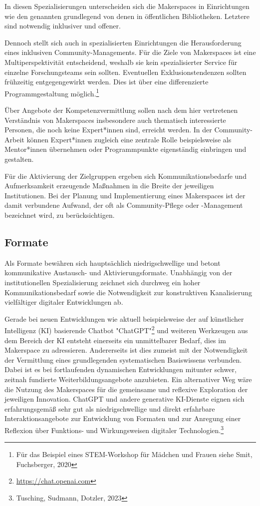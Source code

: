 \documentclass[a4paper,
fontsize=11pt,
oneside,
numbers=noperiodatend,
parskip=half-,
bibliography=totoc,
final
]{scrartcl}
\begin{document}
In diesen Spezialisierungen unterscheiden sich die Makerspaces in
Einrichtungen wie den genannten grundlegend von denen in öffentlichen
Bibliotheken. Letztere sind notwendig inklusiver und offener.

Dennoch stellt sich auch in spezialisierten Einrichtungen die
Herausforderung eines inklusiven Community-Managements. Für die Ziele
von Makerspaces ist eine Multiperspektivität entscheidend, weshalb sie
kein spezialisierter Service für einzelne Forschungsteams sein sollten.
Eventuellen Exklusionstendenzen sollten frühzeitig entgegengewirkt
werden. Dies ist über eine differenzierte Programmgestaltung
möglich.\footnote{Für das Beispiel eines STEM-Workshop für Mädchen und
  Frauen siehe Smit, Fuchsberger, 2020}

Über Angebote der Kompetenzvermittlung sollen nach dem hier vertretenen
Verständnis von Makerspaces insbesondere auch thematisch interessierte
Personen, die noch keine Expert*innen sind, erreicht werden. In der
Community-Arbeit können Expert*innen zugleich eine zentrale Rolle
beispielsweise als Mentor*innen übernehmen oder Programmpunkte
eigenständig einbringen und gestalten.

Für die Aktivierung der Zielgruppen ergeben sich Kommunikationsbedarfe
und Aufmerksamkeit erzeugende Maßnahmen in die Breite der jeweiligen
Institutionen. Bei der Planung und Implementierung eines Makerspaces ist
der damit verbundene Aufwand, der oft als Community-Pflege oder
-Management bezeichnet wird, zu berücksichtigen.

\hypertarget{formate}{%
\subsection{Formate}\label{formate}}

Als Formate bewähren sich hauptsächlich niedrigschwellige und betont
kommunikative Austausch- und Aktivierungsformate. Unabhängig von der
institutionellen Spezialisierung zeichnet sich durchweg ein hoher
Kommunikationsbedarf sowie die Notwendigkeit zur konstruktiven
Kanalisierung vielfältiger digitaler Entwicklungen ab.

Gerade bei neuen Entwicklungen wie aktuell beispielsweise der auf
künstlicher Intelligenz (KI) basierende Chatbot "ChatGPT"\footnote{\url{https://chat.openai.com}}
und weiteren Werkzeugen aus dem Bereich der KI entsteht einerseits ein
unmittelbarer Bedarf, dies im Makerspace zu adressieren. Andererseits
ist dies zumeist mit der Notwendigkeit der Vermittlung eines
grundlegenden systematischen Basiswissens verbunden. Dabei ist es bei
fortlaufenden dynamischen Entwicklungen mitunter schwer, zeitnah
fundierte Weiterbildungsangebote anzubieten. Ein alternativer Weg wäre
die Nutzung des Makerspaces für die gemeinsame und reflexive Exploration
der jeweiligen Innovation. ChatGPT und andere generative KI-Dienste
eignen sich erfahrungsgemäß sehr gut als niedrigschwellige und direkt
erfahrbare Interaktionsangebote zur Entwicklung von Formaten und zur
Anregung einer Reflexion über Funktions- und Wirkungsweisen digitaler
Technologien.\footnote{Tusching, Sudmann, Dotzler, 2023}
\end{document}

